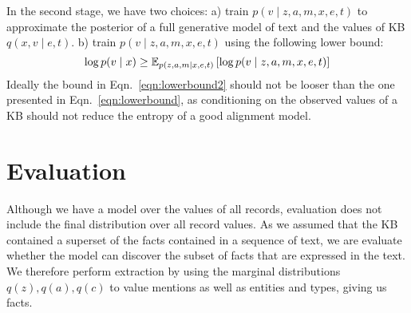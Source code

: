\documentclass[12pt]{article}
\begin{document}
In the second stage, we have two choices:
a) train $p(v \mid z,a,m,x,e,t)$ to approximate the posterior of a full generative model of text and
the values of KB $q(x,v\mid e,t)$.
b) train $p(v \mid z,a,m,x,e,t)$ using the following lower bound:
\begin{equation}
\label{eqn:lowerbound2}
\log p(v\mid x) \geq
\mathbb{E}_{p(z,a,m\mid x,e,t)}\left[\log p(v\mid z,a,m, x,e,t)\right]
\end{equation}
Ideally the bound in Eqn.~\ref{eqn:lowerbound2}
should not be looser than the one presented in Eqn.~\ref{eqn:lowerbound},
as conditioning on the observed values of a KB should not reduce the entropy of
a good alignment model.

\section{Evaluation}
Although we have a model over the values of all records,
evaluation does not include the final distribution over all record values.
As we assumed that the KB contained a superset of the facts contained in
a sequence of text, we are evaluate whether the model can discover the subset of facts that 
are expressed in the text.
We therefore perform extraction by using the marginal distributions
$q(z),q(a),q(c)$ to value mentions as well as entities and types,
giving us facts.



\end{document}
